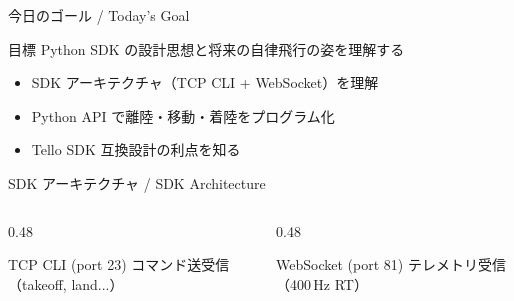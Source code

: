 \documentclass[aspectratio=169, 14pt]{beamer}
\begin{document}
\begin{frame}
  \titlepage
\end{frame}

\begin{frame}{今日のゴール / Today's Goal}
  \begin{block}{目標}
    Python SDK の設計思想と将来の自律飛行の姿を理解する
  \end{block}

  \vspace{1em}

  \begin{itemize}
    \item SDK アーキテクチャ（TCP CLI + WebSocket）を理解
    \item Python API で離陸・移動・着陸をプログラム化
    \item Tello SDK 互換設計の利点を知る
  \end{itemize}
\end{frame}

\begin{frame}{SDK アーキテクチャ / SDK Architecture}
  \centering
  \resizebox{0.85\linewidth}{!}{}

  \vspace{0.5em}

  \begin{columns}[c]
    \begin{column}{0.48\textwidth}
      \begin{block}{TCP CLI (port 23)}
        コマンド送受信（takeoff, land...）
      \end{block}
    \end{column}
    \begin{column}{0.48\textwidth}
      \begin{block}{WebSocket (port 81)}
        テレメトリ受信（400\,Hz RT）
      \end{block}
    \end{column}
  \end{columns}
\end{frame}
\end{document}
